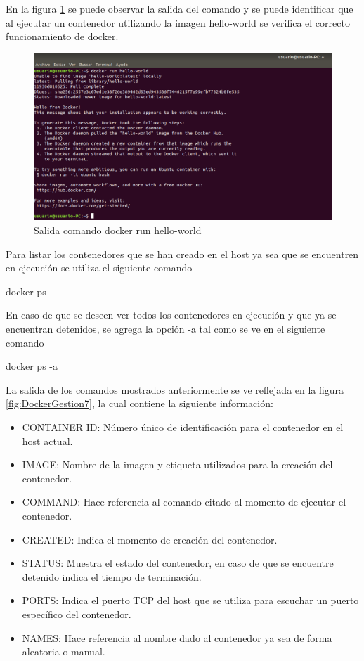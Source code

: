 En la figura \ref{fig:DockerGestion6} se puede observar la salida del comando y se puede identificar que al ejecutar un contenedor utilizando la imagen hello-world se verifica el correcto funcionamiento de docker.

\begin{figure}[!hbtp]
	\centering
	\includegraphics[width=\linewidth]{RE05_Docker/Gestion_basica/REDocker_Gestion6.png}
	\vspace{-0.2cm}
	\caption{Salida comando docker run hello-world}
	\label{fig:DockerGestion6}
\end{figure}

Para listar los contenedores que se han creado en el host ya sea que se encuentren en ejecución se utiliza el siguiente comando
\begin{commandshell} docker ps \end{commandshell}

En caso de que se deseen ver todos los contenedores en ejecución y que ya se encuentran detenidos, se agrega la opción -a tal como se ve en el siguiente comando
\begin{commandshell} docker ps -a \end{commandshell}

La salida de los comandos mostrados anteriormente se ve reflejada en la figura \ref{fig:DockerGestion7}, la cual contiene la siguiente información: 
\begin{itemize}
    \item CONTAINER ID: Número único de identificación para el contenedor en el host actual.
    \item IMAGE: Nombre de la imagen y etiqueta utilizados para la creación del contenedor.
    \item COMMAND: Hace referencia al comando citado al momento de ejecutar el contenedor.
    \item CREATED: Indica el momento de creación del contenedor.
    \item STATUS: Muestra el estado del contenedor, en caso de que se encuentre detenido indica el tiempo de terminación.
    \item PORTS: Indica el puerto TCP del host que se utiliza para escuchar un puerto específico del contenedor.
    \item NAMES: Hace referencia al nombre dado al contenedor ya sea de forma aleatoria o manual. 
\end{itemize}

